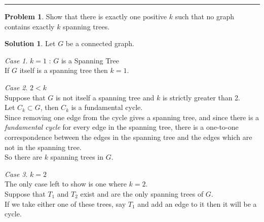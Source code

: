 \documentclass[10pt]{article}
\theoremstyle{plain}
\theoremstyle{definition}
\newtheorem{prob}{Problem}
\newtheorem*{sol}{Solution}
\theoremstyle{remark}
\newtheorem*{case}{Case}
\begin{document}
\thispagestyle{empty}
\maketitle

\newpage

\thispagestyle{empty}

\tableofcontents
\hrule
\listoffigures
\listoftables
\listoftodos

\newpage

\pagestyle{fancy}




\begin{prob}
Show that there is exactly one positive $k$ such that no graph contains exactly $k$ spanning trees.
\end{prob}

\smallskip

\begin{sol}
Let $G$ be a connected graph. \\
\end{sol}

\smallskip


\begin{case}{$k = 1$ : $G$ is a Spanning Tree} \label{case:1} \\
\parindent If $G$ itself is a spanning tree then $k =1$.
\end{case}

\smallskip

\begin{case}{$2 < k$} \label{case:2} \\
\parindent Suppose that $G$ is not itself a spanning tree and $k$ is strictly greater than 2. \\
Let $C_k \subset G$, then $C_k$ is a fundamental cycle. \\
Since removing one edge from the cycle gives a spanning tree, and since there is a \emph{fundamental cycle} for every edge in the spanning tree, there is a one-to-one correspondence between the edges in the spanning tree and the edges which are not in the spanning tree. \\
So there are $k$ spanning trees in $G$.
\end{case}

\smallskip

\begin{case}{$k = 2$} \label{case:3} \\
\parindent The only case left to show is one where $k = 2$. \\
Suppose that $T_1$ and $T_2$ exist and are the only spanning trees of $G$. \\
If we take either one of these trees, say $T_1$ and add an edge to it then it will be a cycle. \\
\\ \\
\end{case}
\end{document}
